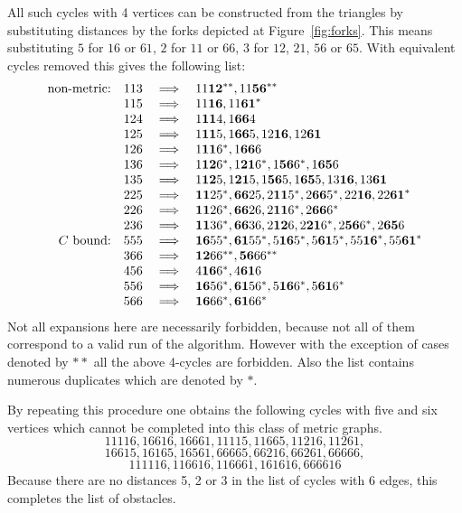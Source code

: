 \documentclass[11pt]{amsart}
\begin{document}
\begin{example}
All such cycles with 4 vertices can be constructed from the triangles by substituting distances by the forks depicted at Figure~\ref{fig:forks}. This means substituting $5$ for $16$ or $61$, $2$ for $11$ or $66$, $3$ for $12$, $21$, $56$ or $65$. With equivalent cycles removed this gives the following list:
$$
\begin{array}{rrcl}
\hbox{non-metric:}&113&\implies& 11\mathbf{12}^{**}, 11\mathbf{56}^{**}\\
&115 &\implies& 11\mathbf{16},  11\mathbf{61}^*\\
&124 &\implies& 1\mathbf{11}4,  1\mathbf{66}4\\
&125 &\implies& 1\mathbf{11}5,  1\mathbf{66}5,  12\mathbf{16},  12\mathbf{61}\\
&126 &\implies& 1\mathbf{11}6^*,  1\mathbf{66}6\\
&136 &\implies& 1\mathbf{12}6^*,  1\mathbf{21}6^*,  1\mathbf{56}6^*,  1\mathbf{65}6\\
&135 &\implies& 1\mathbf{12}5,  1\mathbf{21}5,  1\mathbf{56}5,  1\mathbf{65}5,  13\mathbf{16},  13\mathbf{61}\\
&225 &\implies& \mathbf{11}25^*,  \mathbf{66}25,  2\mathbf{11}5^*,  2\mathbf{66}5^*,  22\mathbf{16},  22\mathbf{61}^*\\
&226 &\implies& \mathbf{11}26^*,  \mathbf{66}26,  2\mathbf{11}6^*,  2\mathbf{66}6^*\\
&236 &\implies& \mathbf{11}36^*,  \mathbf{66}36,  2\mathbf{12}6,  2\mathbf{21}6^*,  2\mathbf{56}6^*,  2\mathbf{65}6\\
\hbox{$C$ bound:}&555 &\implies& \mathbf{16}55^*,  \mathbf{61}55^*,  5\mathbf{16}5^*,  5\mathbf{61}5^*,  55\mathbf{16}^*,  55\mathbf{61}^*\\
&366 &\implies& \mathbf{12}66^{**}, \mathbf{56}66^{**}\\
&456 &\implies& 4\mathbf{16}6^*,  4\mathbf{61}6\\
&556 &\implies& \mathbf{16}56^*,  \mathbf{61}56^*,  5\mathbf{16}6^*,  5\mathbf{61}6^*\\
&566 &\implies& \mathbf{16}66^*,  \mathbf{61}66^*
\end{array}
$$
Not all expansions here are necessarily forbidden, because not all of them correspond to a valid run of the algorithm.  However with the exception of cases denoted by $**$ all the above 4-cycles are forbidden. Also the list contains numerous duplicates which are denoted by $*$.

By repeating this procedure one obtains the following cycles with five and six vertices which cannot be completed into this class of metric graphs.
$$11116, 16616, 16661, 11115, 11665, 11216, 11261,$$
$$16615, 16165, 16561, 66665, 66216, 66261, 66666,$$
$$111116, 116616, 116661, 161616, 666616$$
Because there are no distances 5, 2 or 3 in the list of cycles with 6 edges, this completes the list of obstacles.


\end{example}
\end{document}
